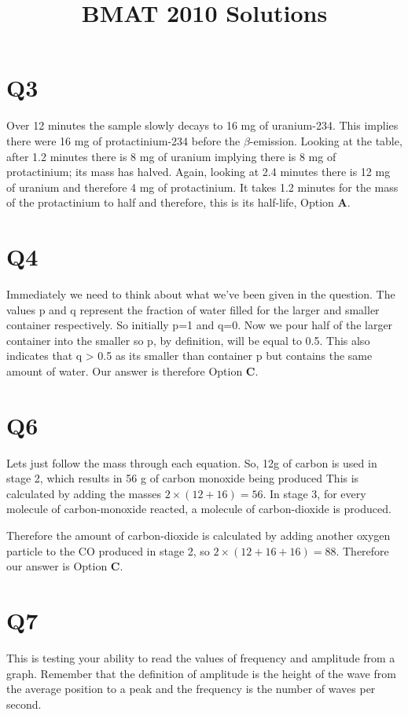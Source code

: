 \documentclass[11pt]{article}
\title{BMAT 2010 Solutions}
\author{}
\date{}                                           %
\begin{document}
\maketitle
\section*{Q3}
Over 12 minutes the sample slowly decays to 16 mg of uranium-234.  This implies there were 16 mg of protactinium-234 before the $\beta$-emission.  Looking at the table, after 1.2 minutes there is 8 mg of uranium implying there is 8 mg of protactinium; its mass has halved.  Again, looking at 2.4 minutes there is 12 mg of uranium and therefore 4 mg of protactinium.  It takes 1.2 minutes for the mass of the protactinium to half and therefore, this is its half-life, Option \textbf{A}.

\section*{Q4}
Immediately we need to think about what we've been given in the question.  The values p and q represent the fraction of water filled for the larger and smaller container respectively.  So initially p=1 and q=0.  Now we pour half of the larger container into the smaller so p, by definition, will be equal to 0.5.  This also indicates that q > 0.5 as its smaller than container p but contains the same amount of water.  Our answer is therefore Option \textbf{C}.

\section*{Q6}
Lets just follow the mass through each equation.  So, 12g of carbon is used in stage 2, which results in 56 g of carbon monoxide being produced This is calculated by adding the masses $2\times(12 + 16)=56$.  In stage 3, for every molecule of carbon-monoxide reacted, a molecule of carbon-dioxide is produced.   

Therefore the amount of carbon-dioxide is calculated by adding another oxygen particle to the CO produced in stage 2, so $2 \times (12+16+16) = 88$.  Therefore our answer is Option \textbf{C}.

\section*{Q7}
This is testing your ability to read the values of frequency and amplitude from a graph.  Remember that the definition of amplitude is the height of the wave from the average position to a peak and the frequency is the number of waves per second.
\end{document}
